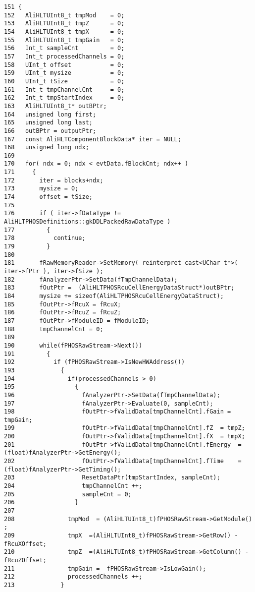 \footnotesize\begin{verbatim}151 {
152   AliHLTUInt8_t tmpMod    = 0;
153   AliHLTUInt8_t tmpZ      = 0;
154   AliHLTUInt8_t tmpX      = 0;
155   AliHLTUInt8_t tmpGain   = 0;
156   Int_t sampleCnt         = 0;
157   Int_t processedChannels = 0;
158   UInt_t offset           = 0; 
159   UInt_t mysize           = 0;
160   UInt_t tSize            = 0;
161   Int_t tmpChannelCnt     = 0;
162   Int_t tmpStartIndex     = 0;
163   AliHLTUInt8_t* outBPtr;
164   unsigned long first;
165   unsigned long last;
166   outBPtr = outputPtr;
167   const AliHLTComponentBlockData* iter = NULL; 
168   unsigned long ndx;
169 
170   for( ndx = 0; ndx < evtData.fBlockCnt; ndx++ )
171     {
172       iter = blocks+ndx;
173       mysize = 0;
174       offset = tSize;
175 
176       if ( iter->fDataType != AliHLTPHOSDefinitions::gkDDLPackedRawDataType )
177         {
178           continue;
179         }
180 
181       fRawMemoryReader->SetMemory( reinterpret_cast<UChar_t*>( iter->fPtr ), iter->fSize );
182       fAnalyzerPtr->SetData(fTmpChannelData);
183       fOutPtr =  (AliHLTPHOSRcuCellEnergyDataStruct*)outBPtr;
184       mysize += sizeof(AliHLTPHOSRcuCellEnergyDataStruct);
185       fOutPtr->fRcuX = fRcuX;
186       fOutPtr->fRcuZ = fRcuZ;
187       fOutPtr->fModuleID = fModuleID;
188       tmpChannelCnt = 0;
189 
190       while(fPHOSRawStream->Next())
191         {
192           if (fPHOSRawStream->IsNewHWAddress())
193             {
194               if(processedChannels > 0)
195                 {
196                   fAnalyzerPtr->SetData(fTmpChannelData);
197                   fAnalyzerPtr->Evaluate(0, sampleCnt);
198                   fOutPtr->fValidData[tmpChannelCnt].fGain = tmpGain;
199                   fOutPtr->fValidData[tmpChannelCnt].fZ  = tmpZ;
200                   fOutPtr->fValidData[tmpChannelCnt].fX  = tmpX; 
201                   fOutPtr->fValidData[tmpChannelCnt].fEnergy  = (float)fAnalyzerPtr->GetEnergy();
202                   fOutPtr->fValidData[tmpChannelCnt].fTime    = (float)fAnalyzerPtr->GetTiming();
203                   ResetDataPtr(tmpStartIndex, sampleCnt);
204                   tmpChannelCnt ++;
205                   sampleCnt = 0;
206                 }
207 
208               tmpMod  = (AliHLTUInt8_t)fPHOSRawStream->GetModule() ;
209               tmpX  =(AliHLTUInt8_t)fPHOSRawStream->GetRow() - fRcuXOffset;
210               tmpZ  =(AliHLTUInt8_t)fPHOSRawStream->GetColumn() - fRcuZOffset;
211               tmpGain =  fPHOSRawStream->IsLowGain(); 
212               processedChannels ++;
213             }

\end{verbatim}
